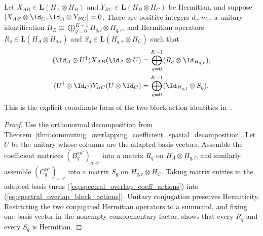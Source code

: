 \begin{theorem}%
    \label{thm:commuting_overlapping_unitary_block_actions}
    \leanok
    Let $X_{AB}\in\mathbf L(H_A\otimes H_B)$ and
    $Y_{BC}\in\mathbf L(H_B\otimes H_C)$ be Hermitian, and suppose
    $[X_{AB}\otimes\Id_C,\Id_A\otimes Y_{BC}]=0$. There are positive
    integers $d_q,m_q$, a unitary identification
    $H_B\cong\bigoplus_{q=0}^{K-1}H_{q,l}\otimes H_{q,r}$, and Hermitian
    operators $R_q\in\mathbf L(H_A\otimes H_{q,l})$ and
    $S_q\in\mathbf L(H_{q,r}\otimes H_C)$ such that
    \begin{align}
        (\Id_A\otimes U^\dagger)X_{AB}(\Id_A\otimes U)
        &=\bigoplus_{q=0}^{K-1}
          (R_q\otimes\Id_{H_{q,r}}), \notag\\
        (U^\dagger\otimes\Id_C)Y_{BC}(U\otimes\Id_C)
        &=\bigoplus_{q=0}^{K-1}
          (\Id_{H_{q,l}}\otimes S_q).
        \label{eq:spectral_overlap_block_actions}
    \end{align}
    This is the explicit coordinate form of the two block-action identities
    in~\cite[Lemma~2.1]{Beigi2012Classification}.
\end{theorem}

\begin{proof}
    \leanok
    Use the orthonormal decomposition from
    Theorem~\ref{thm:commuting_overlapping_coefficient_spatial_decomposition}.
    Let $U$ be the unitary whose columns are the adapted basis vectors.
    Assemble the coefficient matrices $(B_q^{aa'})_{a,a'}$ into a matrix
    $R_q$ on $H_A\otimes H_{q,l}$, and similarly assemble
    $(C_q^{cc'})_{c,c'}$ into a matrix $S_q$ on
    $H_{q,r}\otimes H_C$. Taking matrix entries in the adapted basis turns
    (\ref{eq:spectral_overlap_coeff_actions}) into
    (\ref{eq:spectral_overlap_block_actions}). Unitary conjugation preserves
    Hermiticity. Restricting the two conjugated Hermitian operators to a
    summand, and fixing one basis vector in the nonempty complementary
    factor, shows that every $R_q$ and every $S_q$ is Hermitian.
\end{proof}

